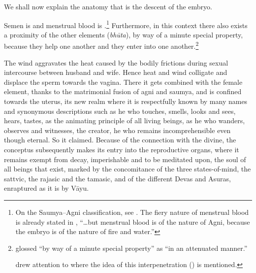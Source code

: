 \begin{translation}


\item[1] 

We shall now explain the anatomy that is the descent of the embryo. 


\item[3]

Semen is  and menstrual blood is
.\footnote{On the Saumya--Agni
    classification, see \cites{wuja-2004}{ange-2021}[521--527]{das-2003}. 
    The fiery nature of menstrual blood is already stated in
    , “\ldots but menstrual blood is of the nature of
    Agni, because the embryo is of the nature of fire and water.”} 
Furthermore, in this context there also exists a proximity of the
other elements (\emph{bhūta}), by way of a minute
special property,
because they help one another and they enter into one
another.\footnote{ glossed 
    “by way of a minute special property” as  “in an
    attenuated manner.”
        
         drew attention
        to  where the idea of this interpenetration
        () is mentioned.}

\bigskip

\begin{tt}
    \raggedright


\item[4]The wind aggravates the heat caused by the bodily frictions during 
sexual intercourse between husband and wife. Hence heat and wind colligate 
and displace the sperm towards the vagina. There it gets combined with the 
female element, thanks to the matrimonial fusion of agni and saumya, and is 
confined towards the uterus, its new realm where it is respectfully known by 
many names and synonymous descriptions such as he who touches, smells, 
looks and sees, hears, tastes, as the animating principle of all living beings, as 
he who wanders, observes and witnesses, the creator, he who remains 
incomprehensible even though eternal. So it claimed. Because of the connection 
with the divine, the conceptus subsequently makes its entry into the reproductive 
organs, where it remains exempt from decay, imperishable and to be meditated 
upon, the soul of all beings that exist, marked by the concomitance of the three 
states-of-mind, the sattvic, the rajasic and the tamasic, and of the different 
Devas and Asuras, enraptured as it is by Vāyu.


\end{tt}
\end{translation}

